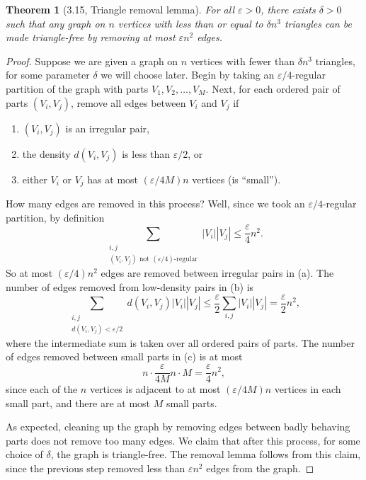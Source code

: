 \documentclass[UTF8,11pt]{ctexart}
\newtheorem*{theorem}{Theorem}
\theoremstyle{definition}
\begin{document}
\begin{theorem}[3.15, Triangle removal lemma]
For all $\varepsilon>0$, there exists $\delta>0$ such that any graph on $n$ vertices with less than or equal to $\delta n^3$ triangles can be made triangle-free by removing at most $\varepsilon n^2$ edges.
\end{theorem}
\begin{proof}
Suppose we are given a graph on $n$ vertices with fewer than $\delta n^3$ triangles, for some parameter $\delta$ we will choose later. Begin by taking an $\varepsilon/4$-regular partition of the graph with parts $V_1,V_2,\ldots,V_M$. Next, for each ordered pair of parts $(V_i,V_j)$, remove all edges between $V_i$ and $V_j$ if
\begin{enumerate}[label=(\alph*)]
\item $(V_i,V_j)$ is an irregular pair,
\item the density $d(V_i,V_j)$ is less than $\varepsilon/2$, or
\item either $V_i$ or $V_j$ has at most $(\varepsilon/4M)n$ vertices (is ``small'').
\end{enumerate}
How many edges are removed in this process? Well, since we took an $\varepsilon/4$-regular partition, by definition
\[\sum_{\substack{i,j\\(V_i,V_j)\text{ not }(\varepsilon/4)\text{-regular}}}|V_i||V_j|\leq\frac{\varepsilon}{4}n^2.\]
So at most $(\varepsilon/4)n^2$ edges are removed between irregular pairs in (a). The number of edges removed from low-density pairs in (b) is
\[\sum_{\substack{i,j\\d(V_i,V_j)<\varepsilon/2}}d(V_i,V_j)|V_i||V_j|
\leq\frac{\varepsilon}{2}\sum_{i,j}|V_i||V_j|=\frac{\varepsilon}{2}n^2,\]
where the intermediate sum is taken over all ordered pairs of parts. The number of edges removed between small parts in (c) is at most
\[n\cdot\frac{\varepsilon}{4M}n\cdot M=\frac{\varepsilon}{4}n^2,\]
since each of the $n$ vertices is adjacent to at most $(\varepsilon/4M)n$ vertices in each small part, and there are at most $M$ small parts.

As expected, cleaning up the graph by removing edges between badly behaving parts does not remove too many edges. We claim that after this process, for some choice of $\delta$, the graph is triangle-free. The removal lemma follows from this claim, since the previous step removed less than $\varepsilon n^2$ edges from the graph.


\end{proof}
\end{document}
